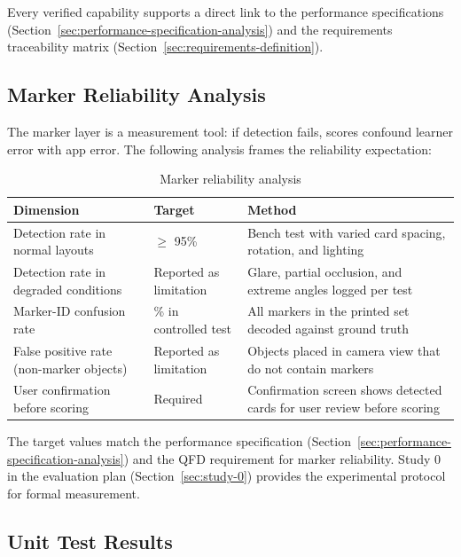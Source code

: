 \documentclass[10pt,a4paper]{article}
\begin{document}
Every verified capability supports a direct link to the performance
specifications (Section~\ref{sec:performance-specification-analysis}) and the
requirements traceability matrix
(Section~\ref{sec:requirements-definition}).

\subsection{Marker Reliability Analysis}
\label{sec:marker-reliability-analysis}

The marker layer is a measurement tool: if detection fails, scores confound
learner error with app error. The following analysis frames the reliability
expectation:

\begin{table}[H]
\centering
\caption{Marker reliability analysis}
\label{tab:marker-reliability-analysis}
\small\renewcommand{\arraystretch}{1.2}\setlength{\tabcolsep}{4pt}
\begin{tabularx}{\textwidth}{|>{\raggedright\arraybackslash}X|>{\raggedright\arraybackslash}X|>{\raggedright\arraybackslash}X|}
\hline
Dimension & Target & Method \\
\hline
Detection rate in normal layouts & $\ge$ 95\% & Bench test with varied card spacing, rotation, and lighting \\
\hline
Detection rate in degraded conditions & Reported as limitation & Glare, partial occlusion, and extreme angles logged per test \\
\hline
Marker-ID confusion rate & 0\% in controlled test & All markers in the printed set decoded against ground truth \\
\hline
False positive rate (non-marker objects) & Reported as limitation & Objects placed in camera view that do not contain markers \\
\hline
User confirmation before scoring & Required & Confirmation screen shows detected cards for user review before scoring \\
\hline
\end{tabularx}
\end{table}

The target values match the performance specification
(Section~\ref{sec:performance-specification-analysis}) and the QFD requirement
for marker reliability. Study 0 in the evaluation plan
(Section~\ref{sec:study-0}) provides the experimental protocol for formal
measurement.

\subsection{Unit Test Results}
\label{sec:unit-test-results}
\end{document}
